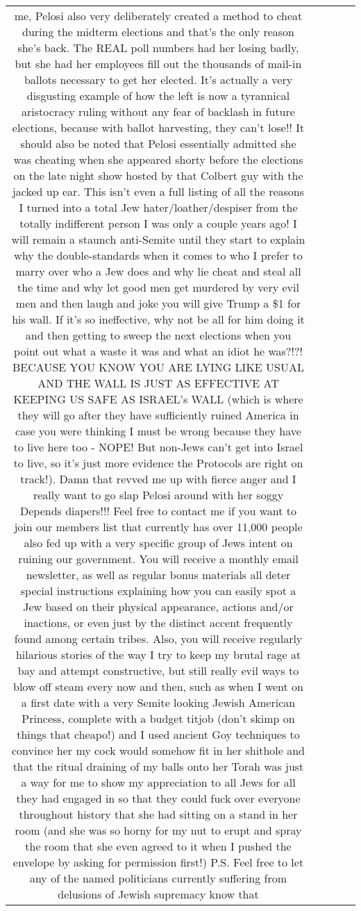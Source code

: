 \documentclass[11pt]{article}
\newlength\mylength
\begin{document}
\begin{center}
\begin{longtable}{|C{.65\mylength}|C{.30\mylength}|C{.12\mylength}|C{.12\mylength}|C{.12\mylength}|}
me, Pelosi also very deliberately created a method to cheat during the midterm elections and that's the only reason she's back. The REAL poll numbers had her losing badly, but she had her employees fill out the thousands of mail-in ballots necessary to get her elected.  It's actually a very disgusting example of how the left is now a tyrannical aristocracy ruling without any fear of backlash in future elections, because with ballot harvesting, they can't lose!!  It should also be noted that Pelosi essentially admitted she was cheating when she appeared shorty before the elections on the late night show hosted by that Colbert guy with the jacked up ear.  This isn't even a full listing of all the reasons I turned into a total Jew hater/loather/despiser from the totally indifferent person I was only a couple years ago!  I will remain a staunch anti-Semite until they start to explain why the double-standards when it comes to who I prefer to marry over who a Jew does and why lie cheat and steal all the time and why let good men get murdered by very evil men and then laugh and joke you will give Trump a \$1 for his wall.  If it's so ineffective, why not be all for him doing it and then getting to sweep the next elections when you point out what a waste it was and what an idiot he was?!?!  BECAUSE YOU KNOW YOU ARE LYING LIKE USUAL AND THE WALL IS JUST AS EFFECTIVE AT KEEPING US SAFE AS ISRAEL's WALL (which is where they will go after they have sufficiently ruined America in case you were thinking I must be wrong because they have to live here too - NOPE!  But non-Jews can't get into Israel to live, so it's just more evidence the Protocols are right on track!).   Damn that revved me up with fierce anger and I really want to go slap Pelosi around with her soggy Depends diapers!!!  Feel free to contact me if you want to join our members list that currently has over 11,000 people also fed up with  a very specific group of Jews intent on ruining our government.  You will receive a monthly email newsletter, as well as regular bonus materials all deter special instructions explaining how you can easily spot a Jew based on their physical appearance, actions and/or inactions, or even just by the distinct accent frequently found among certain tribes.  Also, you will receive regularly hilarious stories of the way I try to keep my brutal rage at bay and attempt constructive, but still really evil ways to blow off steam every now and then, such as when I went on a first date with a very Semite looking Jewish American Princess, complete with a budget titjob (don't skimp on things that cheapo!) and I used ancient Goy techniques to convince her my cock would somehow fit in her shithole and that the ritual draining of my balls onto her  Torah was just a way for me to show my appreciation to all Jews for all they had engaged in so that they could fuck over everyone throughout history that she had sitting on a stand in her room (and she was so horny for my nut to erupt and spray the room that she even agreed to it when I pushed the envelope by asking for permission first!) P.S. Feel free to let any of the named politicians currently suffering from delusions of Jewish supremacy know that 
\end{longtable}
\end{center}
\end{document}
